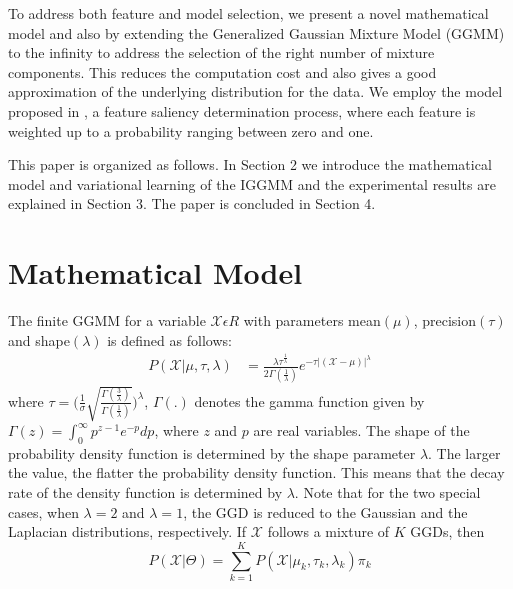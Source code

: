 \documentclass[letterpaper]{article}
\begin{document}
To address both feature and model selection, we present a novel mathematical model and also by extending the Generalized Gaussian Mixture Model (GGMM) to the infinity to address the selection of the right number of mixture components. 
This reduces the computation cost and also gives a good approximation of the underlying distribution for the data.
We employ the model proposed in \cite{constantinopoulos2006bayesian}, a feature saliency determination process,
where each feature is weighted up to a probability ranging between zero and one.

This paper is organized as follows. In Section 2 we introduce the mathematical model and variational learning of the IGGMM and the experimental
results are explained in Section 3. The paper is concluded in Section 4.


\section{Mathematical Model}
The finite GGMM for a variable $\mathcal{X} \epsilon R $ with parameters mean$(\mu)$, precision$(\tau)$ and shape$(\lambda)$ is defined as follows:
\begin{equation}
    \begin{split}
        P(\mathcal{X}|\mu, \tau, \lambda) &= \frac{\lambda  \tau^\frac{1}{\lambda}}{2\Gamma(\frac{1}{\lambda})}
          e^{-\tau  |(\mathcal{X}-\mu)|^{\lambda}}    
    \end{split}
    \label{ggmm}
    \end{equation}
where $\tau = \bigg({\frac{1}{\sigma} \sqrt{\frac{\Gamma(\frac{3}{\lambda})}{\Gamma(\frac{1}{\lambda})}}}\bigg)^\lambda$, $\Gamma(.)$ denotes the gamma function given by $\Gamma(z) = \int_{0}^{\infty}p^{z-1}e^{-p} dp$, where $z$ and $p$ are real variables.
The shape of the probability density function is determined by the shape parameter $\lambda$.
The larger the value, the flatter the probability density function. This means that the decay rate of the density function is determined by  $\lambda$. 
Note that for the two special cases, when $\lambda = 2$ and $\lambda = 1$, the GGD is reduced to the Gaussian and the Laplacian distributions, respectively.
If $\mathcal{X}$ follows a mixture of $K$ GGDs, then 
\begin{equation}
    P(\mathcal{X}|\Theta) = \sum_{k = 1}^{K} P(\mathcal{X}|\mu_k, \tau_k, \lambda_k)\pi_k
\end{equation}
\end{document}
